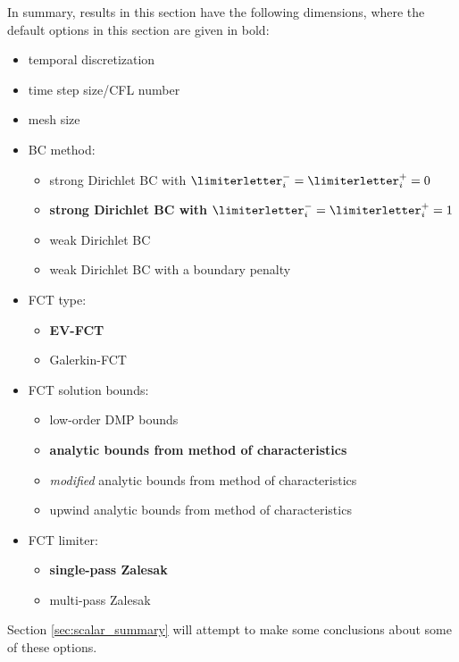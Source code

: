In summary, results in this section have the following dimensions, where
the default options in this section are given in bold:
\begin{itemize}
  \item temporal discretization
  \item time step size/CFL number
  \item mesh size
  \item BC method:
    \begin{itemize}
      \item strong Dirichlet BC with $\limiterletter_i^-=\limiterletter_i^+=0$
      \item \textbf{strong Dirichlet BC with $\limiterletter_i^-=\limiterletter_i^+=1$}
      \item weak Dirichlet BC
      \item weak Dirichlet BC with a boundary penalty
    \end{itemize}
  \item FCT type:
    \begin{itemize}
      \item \textbf{EV-FCT}
      \item Galerkin-FCT
    \end{itemize}
  \item FCT solution bounds:
    \begin{itemize}
      \item low-order DMP bounds
      \item \textbf{analytic bounds from method of characteristics}
      \item \emph{modified} analytic bounds from method of characteristics
      \item upwind analytic bounds from method of characteristics
    \end{itemize}
  \item FCT limiter:
    \begin{itemize}
      \item \textbf{single-pass Zalesak}
      \item multi-pass Zalesak
    \end{itemize}
\end{itemize}

Section \ref{sec:scalar_summary} will attempt to make some conclusions about
some of these options.

